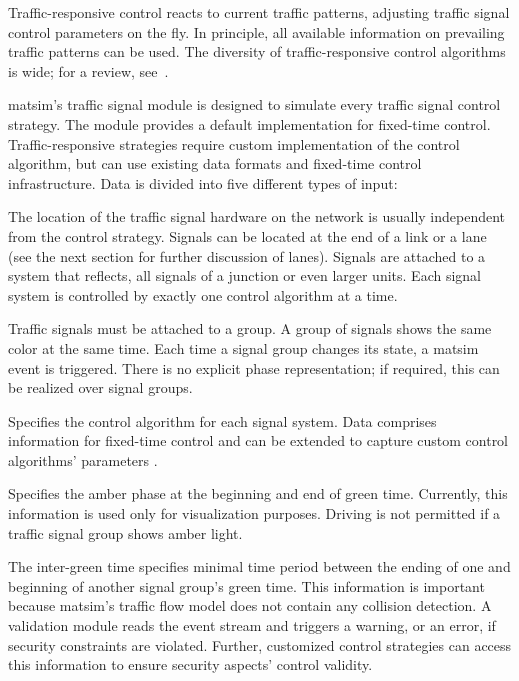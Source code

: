 Traffic-responsive control reacts to current traffic patterns, adjusting traffic signal control parameters on the fly. 
In principle, all available information on prevailing traffic patterns can be used. 
The diversity of traffic-responsive control algorithms is wide; for a review, see~\citet[][]{Grether2014PhD}. 

\gls{matsim}'s traffic signal module is designed to simulate every traffic signal control strategy. 
The module provides a default implementation for fixed-time control. 
Traffic-responsive strategies require custom implementation of the control algorithm, but can use existing data formats and fixed-time control infrastructure. 
Data is divided into five different types of input:
%
\begin{description}\styleDescription
	\item[Signals \& Systems:] The location of the traffic signal hardware on the network is usually independent from the control strategy. 
		Signals can be located at the end of a link or a lane (see the next section for further discussion of lanes). Signals are attached to a system that reflects, \eg all signals of a junction or even larger units. 
		Each signal system is controlled by exactly one control algorithm at a time.  
	\item[Signal Groups:] Traffic signals must be attached to a group. 
		A group of signals shows the same color at the same time. 
		Each time a signal group changes its state, a \gls{matsim} event is triggered. 
		There is no explicit phase representation; 
		if required, this can be realized over signal groups.  
	\item[Signal Control:] Specifies the control algorithm for each signal system. 
		Data comprises information for fixed-time control and can be extended to capture custom control algorithms' parameters . 
	\item[Amber:] Specifies the amber phase at the beginning and end of green time. 
		Currently, this information is used only for visualization purposes. 
		Driving is not permitted if a traffic signal group shows amber light. 
	\item[Intergreens:] The inter-green time specifies minimal time period between the ending of one and beginning of another signal group's green time.  
		This information is important because \gls{matsim}'s traffic flow model does not contain any collision detection. 
		A validation module reads the event stream and triggers a warning, or an error, if security constraints are violated. 
		Further, customized control strategies can access this information to ensure security aspects' control validity.    
\end{description}

